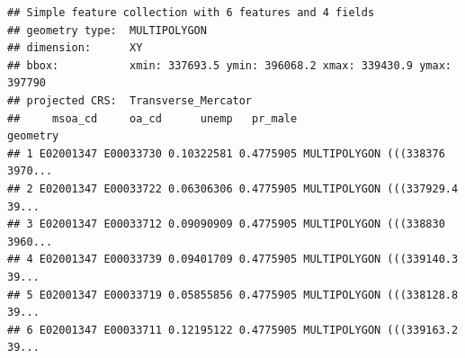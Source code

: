 \documentclass[
]{book}
\newenvironment{Shaded}{\begin{snugshade}}{\end{snugshade}}
\newcommand{\AttributeTok}[1]{\textcolor[rgb]{0.77,0.63,0.00}{#1}}
\newcommand{\CommentTok}[1]{\textcolor[rgb]{0.56,0.35,0.01}{\textit{#1}}}
\newcommand{\ConstantTok}[1]{\textcolor[rgb]{0.00,0.00,0.00}{#1}}
\newcommand{\DecValTok}[1]{\textcolor[rgb]{0.00,0.00,0.81}{#1}}
\newcommand{\FunctionTok}[1]{\textcolor[rgb]{0.00,0.00,0.00}{#1}}
\newcommand{\NormalTok}[1]{#1}
\newcommand{\OtherTok}[1]{\textcolor[rgb]{0.56,0.35,0.01}{#1}}
\newcommand{\SpecialCharTok}[1]{\textcolor[rgb]{0.00,0.00,0.00}{#1}}
\newcommand{\StringTok}[1]{\textcolor[rgb]{0.31,0.60,0.02}{#1}}
\begin{document}
\begin{Shaded}
\end{Shaded}

\begin{verbatim}
## Simple feature collection with 6 features and 4 fields
## geometry type:  MULTIPOLYGON
## dimension:      XY
## bbox:           xmin: 337693.5 ymin: 396068.2 xmax: 339430.9 ymax: 397790
## projected CRS:  Transverse_Mercator
##     msoa_cd     oa_cd      unemp   pr_male                       geometry
## 1 E02001347 E00033730 0.10322581 0.4775905 MULTIPOLYGON (((338376 3970...
## 2 E02001347 E00033722 0.06306306 0.4775905 MULTIPOLYGON (((337929.4 39...
## 3 E02001347 E00033712 0.09090909 0.4775905 MULTIPOLYGON (((338830 3960...
## 4 E02001347 E00033739 0.09401709 0.4775905 MULTIPOLYGON (((339140.3 39...
## 5 E02001347 E00033719 0.05855856 0.4775905 MULTIPOLYGON (((338128.8 39...
## 6 E02001347 E00033711 0.12195122 0.4775905 MULTIPOLYGON (((339163.2 39...
\end{verbatim}
\end{document}
